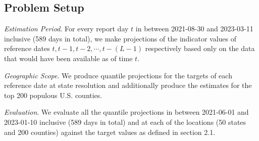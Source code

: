 \subsection{Problem Setup}
\textit{Estimation Period}. For every report day $t$ in between 2021-08-30 and 2023-03-11 inclusive (589 days in total), we make projections of the indicator values of reference dates $t, t-1, t-2, \cdots, t-(L-1)$ respectively based only on the data that would have been available as of time $t$. 

\textit{Geographic Scope}. We produce quantile projections for the targets of each reference date at state resolution and additionally produce the estimates for the top 200 populous U.S. counties. 

\textit{Evaluation}. We evaluate all the quantile projections in between 2021-06-01 and 2023-01-10 inclusive (589 days in total) and at each of the locations (50 states and 200 counties) against the target values as defined in section 2.1.

